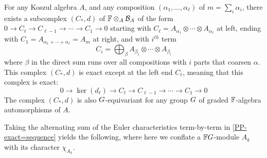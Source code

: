 \begin{thm} \cite[Chap. 2, Prop. 8.3]{PP}
For any Koszul algebra $A$, and any composition $(\alpha_1,\ldots,\alpha_\ell)$ of $m=\sum_i \alpha_i$, there exists a subcomplex $(C_*,d)$ of $\mathbb{F} \otimes_A \mathcal{B}_A$ of the form
$
0\rightarrow C_\ell \rightarrow C_{\ell-1} \rightarrow \cdots \rightarrow 
C_1 \rightarrow 0
$
starting with 
$C_\ell=A_{\alpha_1} \otimes \cdots \otimes A_{\alpha_\ell}$ at left, ending with
$C_1=A_{\alpha_1+\cdots+\alpha_\ell}=A_m$ at right,
and with $i^{th}$ term 
$$
C_i=\bigoplus_\beta 
A_{\beta_1} \otimes \cdots \otimes A_{\beta_i}
$$
where $\beta$ in the direct sum runs over all compositions
with $i$ parts that coarsen $\alpha$.
This complex $(C_*,d)$ is exact except at the left end $C_\ell$, meaning that this complex is exact:
\begin{equation}
\label{PP-exact=sequence}
0 \rightarrow \ker(d_\ell) \rightarrow C_\ell \rightarrow C_{\ell-1} \rightarrow \cdots \rightarrow 
C_1 \rightarrow 0
\end{equation}
The complex  $(C_*,d)$ is also
$G$-equivariant for any group $G$ of graded $\mathbb{F}$-algebra automorphisms of $A$.
\end{thm}

Taking the alternating sum of the Euler characteristics term-by-term in \eqref{PP-exact=sequence} yields the
following, where here we conflate a $\mathbb{F} G$-module $A_k$
with its character $\chi_{A_k}$.


